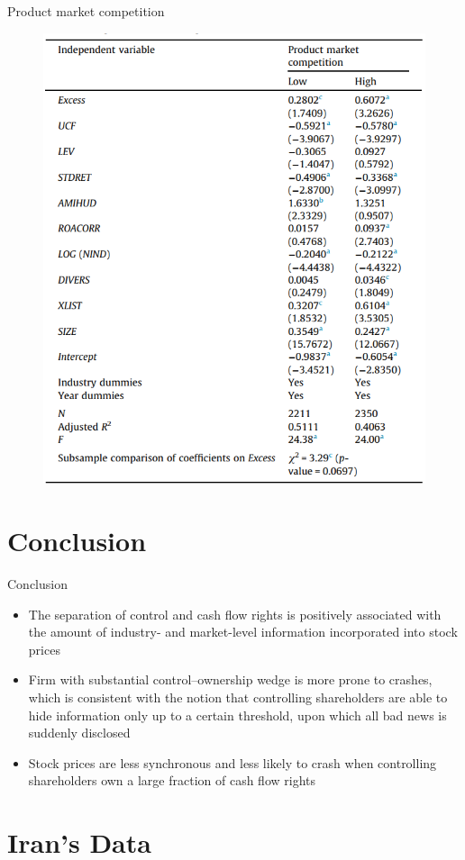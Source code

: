 \documentclass{beamer}
\begin{document}
\begin{frame}{Product market competition}
	\begin{figure}
		\centering
		\includegraphics[width=0.7\textheight]{t9}
		\label{fig:t9}
	\end{figure}
\end{frame}





\section{Conclusion}
\begin{frame}{Conclusion}
	\begin{itemize}
		\item The separation of
		control and cash flow rights is positively associated with the
		amount of industry- and market-level information incorporated
		into stock prices
		\item 
		Firm with 
		substantial control–ownership wedge is more prone to crashes,
		which is consistent with the notion that controlling shareholders
		are able to hide information only up to a certain threshold, upon
		which all bad news is suddenly disclosed
		\item Stock prices are less synchronous and less likely to crash when controlling shareholders
		own a large fraction of cash flow rights
	\end{itemize}
\end{frame}
\section{Iran's Data}
\begin{frame}
	\begin{table}[htbp]
		\centering
		\resizebox{0.7\textheight}{!}{
			
			\label{tab:synchronicityt4}	
		}
	\end{table}
\end{frame}
\end{document}
